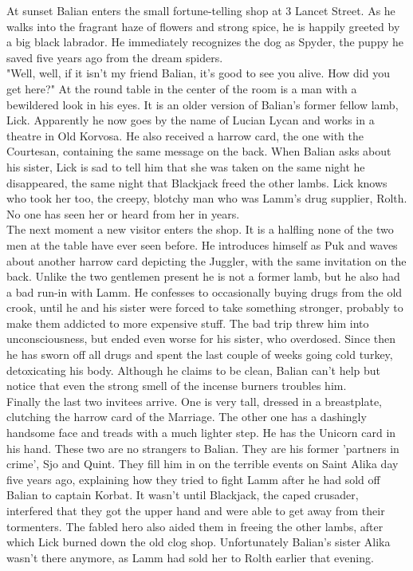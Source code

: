 At sunset Balian enters the small fortune-telling shop at 3 Lancet Street. As he walks into the fragrant haze of flowers and strong spice, he is happily greeted by a big black labrador. He immediately recognizes the dog as Spyder, the puppy he saved five years ago from the dream spiders.\\

"Well, well, if it isn't my friend Balian, it's good to see you alive. How did you get here?" At the round table in the center of the room is a man with a bewildered look in his eyes. It is an older version of Balian's former fellow lamb, Lick. Apparently he now goes by the name of Lucian Lycan and works in a theatre in Old Korvosa. He also received a harrow card, the one with the Courtesan, containing the same message on the back. When Balian asks about his sister, Lick is sad to tell him that she was taken on the same night he disappeared, the same night that Blackjack freed the other lambs. Lick knows who took her too, the creepy, blotchy man who was Lamm's drug supplier, Rolth. No one has seen her or heard from her in years.\\

The next moment a new visitor enters the shop. It is a halfling none of the two men at the table have ever seen before. He introduces himself as Puk and waves about another harrow card depicting the Juggler, with the same invitation on the back. Unlike the two gentlemen present he is not a former lamb, but he also had a bad run-in with Lamm. He confesses to occasionally buying drugs from the old crook, until he and his sister were forced to take something stronger, probably to make them addicted to more expensive stuff. The bad trip threw him into unconsciousness, but ended even worse for his sister, who overdosed. Since then he has sworn off all drugs and spent the last couple of weeks going cold turkey, detoxicating his body. Although he claims to be clean, Balian can't help but notice that even the strong smell of the incense burners troubles him.\\

Finally the last two invitees arrive. One is very tall, dressed in a breastplate, clutching the harrow card of the Marriage. The other one has a dashingly handsome face and treads with a much lighter step. He has the Unicorn card in his hand. These two are no strangers to Balian. They are his former 'partners in crime', Sjo and Quint. They fill him in on the terrible events on Saint Alika day five years ago, explaining how they tried to fight Lamm after he had sold off Balian to captain Korbat. It wasn't until Blackjack, the caped crusader, interfered that they got the upper hand and were able to get away from their tormenters. The fabled hero also aided them in freeing the other lambs, after which Lick burned down the old clog shop. Unfortunately Balian's sister Alika wasn't there anymore, as Lamm had sold her to Rolth earlier that evening.\\

